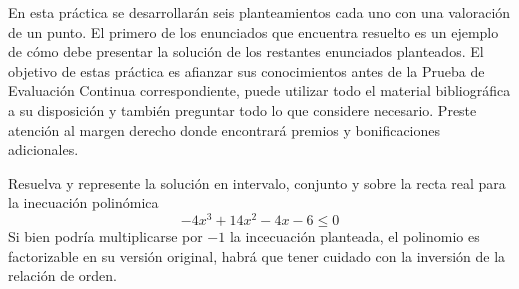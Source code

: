 \documentclass[a4 paper]{article}
\begin{document}

En esta práctica se desarrollarán seis planteamientos cada uno con una valoración de un punto. El primero de los enunciados que encuentra resuelto es un ejemplo de cómo debe presentar la solución de los restantes enunciados planteados. El objetivo de estas práctica es afianzar sus conocimientos antes de la Prueba de Evaluación Continua correspondiente, puede utilizar todo el material bibliográfica a su disposición y también preguntar todo lo que considere necesario. Preste atención al margen derecho donde encontrará premios y bonificaciones adicionales.

\vspace{5mm}

  Resuelva y represente la solución en intervalo, conjunto y sobre la recta real para la inecuación polinómica
	\[
		-4x^3 + 14x^2 - 4x - 6 \leq 0
	\]
\solution{}
Si bien podría multiplicarse por $-1$ la incecuación planteada, el polinomio es factorizable en su versión original, habrá que tener cuidado con la inversión de la relación de orden.
\end{document}
